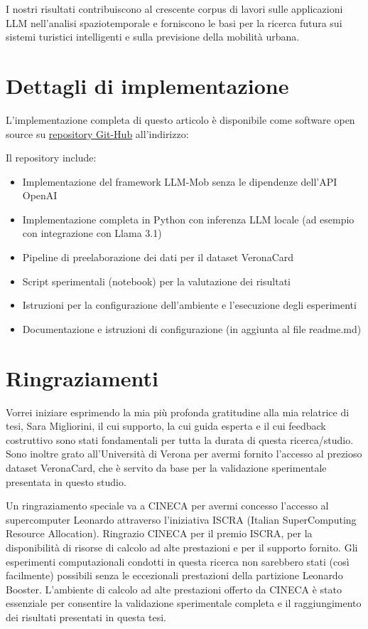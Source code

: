 \documentclass[12pt,a4paper]{article}
\begin{document}
I nostri risultati contribuiscono al crescente corpus di lavori sulle applicazioni LLM nell'analisi spaziotemporale e forniscono le basi per la ricerca futura sui sistemi turistici intelligenti e sulla previsione della mobilità urbana.

\newpage

\section{Dettagli di implementazione}

L'implementazione completa di questo articolo è disponibile come software open source su \href{https://github.com/simo-hue/LLM-Mob-As-Mobility-Interpreter.git}{repository Git-Hub} all'indirizzo:

Il repository include:
\begin{itemize}
\item Implementazione del framework LLM-Mob senza le dipendenze dell'API OpenAI
\item Implementazione completa in Python con inferenza LLM locale (ad esempio con integrazione con Llama 3.1)
\item Pipeline di preelaborazione dei dati per il dataset VeronaCard
\item Script sperimentali (notebook) per la valutazione dei risultati
\item Istruzioni per la configurazione dell'ambiente e l'esecuzione degli esperimenti
\item Documentazione e istruzioni di configurazione (in aggiunta al file readme.md)
\end{itemize}

\newpage

\section{Ringraziamenti}

Vorrei iniziare esprimendo la mia più profonda gratitudine alla mia relatrice di tesi, Sara Migliorini, il cui supporto, la cui guida esperta e il cui feedback costruttivo sono stati fondamentali per tutta la durata di questa ricerca/studio. Sono inoltre grato all'Università di Verona per avermi fornito l'accesso al prezioso dataset VeronaCard, che è servito da base per la validazione sperimentale presentata in questo studio.

Un ringraziamento speciale va a CINECA per avermi concesso l'accesso al supercomputer Leonardo attraverso l'iniziativa ISCRA (Italian SuperComputing Resource Allocation). Ringrazio CINECA per il premio ISCRA, per la disponibilità di risorse di calcolo ad alte prestazioni e per il supporto fornito. Gli esperimenti computazionali condotti in questa ricerca non sarebbero stati (così facilmente) possibili senza le eccezionali prestazioni della partizione Leonardo Booster. L'ambiente di calcolo ad alte prestazioni offerto da CINECA è stato essenziale per consentire la validazione sperimentale completa e il raggiungimento dei risultati presentati in questa tesi.
\end{document}
